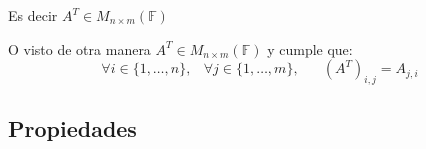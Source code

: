 \documentclass[12pt, fleqn]{report}                             %
\DeclareMathOperator \Space {\quad}                             %
\DeclareMathOperator \MiniSpace {\;}                            %
\begin{document}
                Es decir $A^T \in M_{n \times m}(\mathbb{F})$

                O visto de otra manera $A^T \in M_{n \times m}(\mathbb{F})$ y cumple que:
                \begin{equation}
                    \forall i \in \{1, \dots, n\} ,\MiniSpace
                        \forall j \in \{1, \dots, m\} ,\Space
                            (A^T)_{i, j} = A_{j, i}
                \end{equation}


            \clearpage
            \subsection{Propiedades}
\end{document}
